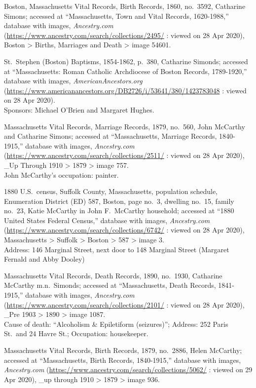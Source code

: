 \begin{thebibliography}{999}
	Boston, Massachusetts Vital Records, Birth Records, 1860, no.\ 3592, Catharine Simons; accessed at ``Massachusetts, Town and Vital Records, 1620-1988,'' database with images, \textit{Ancestry.com} (\url{https://www.ancestry.com/search/collections/2495/} : viewed on 28 Apr 2020), Boston > Births, Marriages and Death > image 54601.
	
	St.\ Stephen (Boston) Baptisms, 1854-1862, p.\ 380, Catharine Simonds; accessed at ``Massachusetts: Roman Catholic Archdiocese of Boston Records, 1789-1920,'' database with images, \textit{AmericanAncestors.org} (\url{https://www.americanancestors.org/DB2726/i/53641/380/1423783048} : viewed on 28 Apr 2020).\\
	Sponsors: Michael O'Brien and Margaret Hughes.
	
	Massachusetts Vital Records, Marriage Records, 1879, no.\ 560, John McCarthy and Catharine Simons; accessed at ``Massachusetts, Marriage Records, 1840-1915,'' database with images, \textit{Ancestry.com} (\url{https://www.ancestry.com/search/collections/2511/} : viewed on 28 Apr 2020), \_Up Through 1910 > 1879 > image 757.\\
	John McCarthy's occupation: painter.
	
	1880 U.S.\ census, Suffolk County, Massachusetts, population schedule, Enumeration District (ED) 587, Boston, page no.\ 3, dwelling no.\ 15, family no.\ 23, Katie McCarthy in John F.\ McCarthy household; accessed at ``1880 United States Federal Census,'' database with images, \textit{Ancestry.com} (\url{https://www.ancestry.com/search/collections/6742/} : viewed on 28 Apr 2020), Massachusetts > Suffolk > Boston > 587 > image 3.\\
	Address: 146 Marginal Street, next door to 148 Marginal Street (Margaret Fernald and Abby Dooley)
	
	Massachusetts Vital Records, Death Records, 1890, no.\ 1930, Catharine McCarthy m.n.\ Simonds; accessed at ``Massachusetts, Death Records, 1841-1915,'' database with images, \textit{Ancestry.com} (\url{https://www.ancestry.com/search/collections/2101/} : viewed on 28 Apr 2020), \_Pre 1903 > 1890 > image 1087.\\
	Cause of death: ``Alcoholism \& Epiletiform (seizures)''; Address: 252 Paris St.\ and 24 Havre St.; Occupation: housekeeper.
	
	Massachusetts Vital Records, Birth Records, 1879, no.\ 2886, Helen McCarthy; accessed at ``Massachusetts, Birth Records, 1840-1915,'' database with images, \textit{Ancestry.com} (\url{https://www.ancestry.com/search/collections/5062/} : viewed on 29 Apr 2020), \_up through 1910 > 1879 > image 936.
	

\end{thebibliography}
